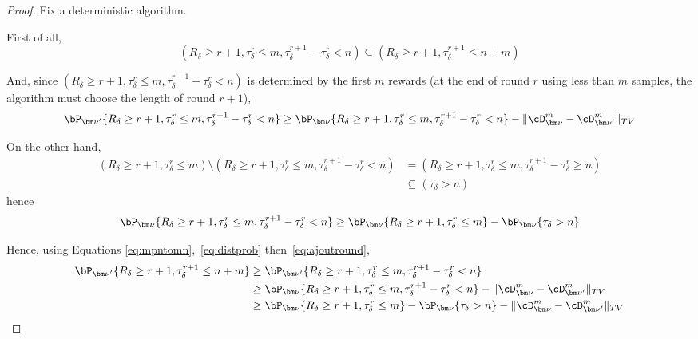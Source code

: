 \begin{proof}
	Fix a deterministic algorithm. 
	
	
	First of all, \begin{equation}\label{eq:mpntomn}(R_\delta \geq r+1,\tau_\delta^{r} \leq m,\tau_\delta^{r+1}-\tau_\delta^r < n) \subseteq (R_\delta \geq r+1,\tau_\delta^{r+1}\leq n+m)\end{equation}
	
	And, since $(R_\delta \geq r+1,\tau_\delta^{r} \leq m,\tau_\delta^{r+1}-\tau_\delta^r < n)$ is determined by the first $m$ rewards (at the end of round $r$ using less than $m$ samples, the algorithm must choose the length of round $r+1$), \begin{equation}\label{eq:distprob} \bP_{{\bm\nu}'}\{R_\delta \geq r+1,\tau_\delta^{r} \leq m,\tau_\delta^{r+1}-\tau_\delta^r < n\} \geq \bP_{\bm\nu} \{R_\delta \geq r+1,\tau_\delta^{r} \leq m,\tau_\delta^{r+1}-\tau_\delta^r < n\}  -\Vert\cD_{\bm\nu}^m -\cD_{{\bm\nu}'}^m\Vert_{TV}\end{equation}

On the other hand, \begin{align*}
	(R_\delta \geq r+1,\tau_\delta^r\leq m)\setminus (R_\delta\geq r+1,\tau_\delta^r\leq m,\tau_\delta^{r+1}-\tau_\delta^r < n) &= (R_\delta\geq r+1,\tau_\delta^r\leq m, \tau_\delta^{r+1}-\tau_\delta^r \geq n) \\
	&\subseteq (\tau_\delta >n)
\end{align*} hence \begin{equation}\label{eq:ajoutround}\bP_{\bm\nu}\{R_\delta\geq r+1,\tau_\delta^r\leq m,\tau_\delta^{r+1}-\tau_\delta^r < n\}\geq \bP_{\bm\nu}\{R_\delta \geq r+1,\tau_\delta^r\leq m\}-\bP_{\bm\nu}\{\tau_\delta >n\}\end{equation}

	Hence, using Equations \eqref{eq:mpntomn},~\eqref{eq:distprob} then~\eqref{eq:ajoutround}, \begin{align*}
		\bP_{{\bm\nu}'}\{R_\delta \geq r+1,\tau_\delta^{r+1}\leq n+m\}&\geq \bP_{\bm\nu'} \{R_\delta \geq r+1,\tau_\delta^{r} \leq m,\tau_\delta^{r+1}-\tau_\delta^r < n\}\\
		&\geq \bP_{\bm\nu} \{R_\delta \geq r+1,\tau_\delta^{r} \leq m,\tau_\delta^{r+1}-\tau_\delta^r < n\} -\Vert\cD_{\bm\nu}^m -\cD_{{\bm\nu}'}^m\Vert_{TV} \\
		&\geq \bP_{\bm\nu}\{R_\delta \geq r+1,\tau_\delta^r\leq m\}-\bP_{\bm\nu} \{\tau_\delta>n\} -\Vert\cD_{\bm\nu}^m -\cD_{{\bm\nu}'}^m\Vert_{TV}
	\end{align*}
	
\end{proof}



